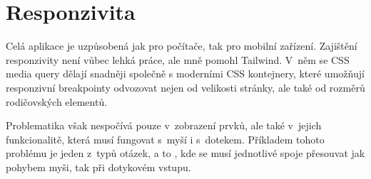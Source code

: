 \documentclass[12pt, a4paper,
openright
]{report}
\begin{document}
\section{Responzivita}
Celá aplikace je uzpůsobená jak pro počítače, tak pro mobilní zařízení. Zajištění responzivity není vůbec lehká práce, ale mně pomohl Tailwind. V~něm se CSS media query dělají snadněji společně s moderními CSS kontejnery, které umožňují responzivní breakpointy odvozovat nejen od velikosti stránky, ale také od rozměrů rodičovských elementů.

Problematika však nespočívá pouze v~zobrazení prvků, ale také v~jejich funkcionalitě, která musí fungovat s~myší i s~dotekem. Příkladem tohoto problému je jeden z~typů otázek, a to , kde se musí jednotlivé spoje přesouvat jak pohybem myši, tak při dotykovém vstupu.
\end{document}
